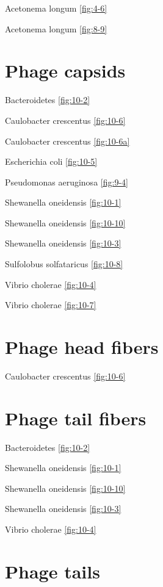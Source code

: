 \documentclass[]{tufte-book}
\begin{document}
Acetonema longum \ref{fig:4-6}

Acetonema longum \ref{fig:8-9}

\hypertarget{phage-capsids}{%
\section*{Phage capsids}\label{phage-capsids}}

Bacteroidetes \ref{fig:10-2}

Caulobacter crescentus \ref{fig:10-6}

Caulobacter crescentus \ref{fig:10-6a}

Escherichia coli \ref{fig:10-5}

Pseudomonas aeruginosa \ref{fig:9-4}

Shewanella oneidensis \ref{fig:10-1}

Shewanella oneidensis \ref{fig:10-10}

Shewanella oneidensis \ref{fig:10-3}

Sulfolobus solfataricus \ref{fig:10-8}

Vibrio cholerae \ref{fig:10-4}

Vibrio cholerae \ref{fig:10-7}

\hypertarget{phage-head-fibers}{%
\section*{Phage head fibers}\label{phage-head-fibers}}

Caulobacter crescentus \ref{fig:10-6}

\hypertarget{phage-tail-fibers}{%
\section*{Phage tail fibers}\label{phage-tail-fibers}}

Bacteroidetes \ref{fig:10-2}

Shewanella oneidensis \ref{fig:10-1}

Shewanella oneidensis \ref{fig:10-10}

Shewanella oneidensis \ref{fig:10-3}

Vibrio cholerae \ref{fig:10-4}

\hypertarget{phage-tails}{%
\section*{Phage tails}\label{phage-tails}}
\end{document}
